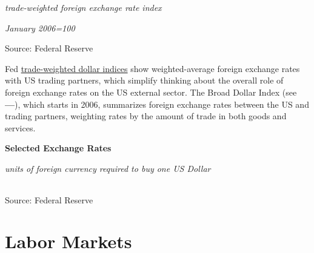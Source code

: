 \documentclass{report}
\makeatletter
\newcommand{\tbllink}[1]{\href{https://raw.githubusercontent.com/bdecon/US-chartbook/master/chartbook/data/#1}{\faTable}}
\newcommand*\short[1]{\expandafter\@gobbletwo\number\numexpr#1\relax}
\newcommand{\dateaxisticks}{
		date coordinates in=x, axis line style={draw=none},
		xmax={2020-10-01},
		max space between ticks=40,	    
		xtick={{1990-01-01}, {1992-01-01}, {1994-01-01}, 
			{1996-01-01}, {1998-01-01}, {2000-01-01}, 
			{2002-01-01}, {2004-01-01}, {2006-01-01},
			{2008-01-01}, {2010-01-01}, {2012-01-01}, {2014-01-01},
		    {2016-01-01}, {2018-01-01}, {2020-01-01}},
		minor xtick={{1989-01-01}, {1991-01-01}, {1993-01-01},
			{1995-01-01}, {1997-01-01}, {1999-01-01}, 
			{2001-01-01}, {2003-01-01}, {2005-01-01}, {2007-01-01},
		    {2009-01-01}, {2011-01-01}, {2013-01-01}, {2015-01-01},
		    {2017-01-01}, {2019-01-01}},
		enlarge y limits={0.06}, enlarge x limits={0.01},
		}
\newcommand{\bbar}[2]{extra #1 ticks = {{#2}}, extra #1 tick labels = ,
		extra #1 tick style = {grid=major, grid style={thick, black!25}},}
\newcommand{\stdline}[4]{\addplot[very thick, no markers, color=#1] 
		table [x=#2, y=#3, col sep=comma] {#4};	}
\newcommand{\rbars}{
		\fill[color=black!10] (axis cs:{1990-07-01},\pgfkeysvalueof{/pgfplots/ymin}) rectangle 
			(axis cs:{1991-03-01}, \pgfkeysvalueof{/pgfplots/ymax});
		\fill[color=black!10] (axis cs:{2007-12-01},\pgfkeysvalueof{/pgfplots/ymin}) rectangle 
			(axis cs:{2009-07-01}, \pgfkeysvalueof{/pgfplots/ymax});
		\fill[color=black!10] (axis cs:{2001-03-01},\pgfkeysvalueof{/pgfplots/ymin}) rectangle 
			(axis cs:{2001-11-01}, \pgfkeysvalueof{/pgfplots/ymax});
		\fill[color=black!10] (axis cs:{2020-02-01},\pgfkeysvalueof{/pgfplots/ymin}) rectangle 
			(axis cs:{2020-10-01}, \pgfkeysvalueof{/pgfplots/ymax});}
\makeatother
\begin{document}
{{{{{{\begin{minipage}{0.33\textwidth}
\footnotesize{\textit{trade-weighted foreign exchange rate index}}

\footnotesize{\textit{January 2006=100}}

\hspace*{-2mm} 

\footnotesize{Source: Federal Reserve} \hfill \tbllink{fx_idx.csv}
\end{minipage}\hspace{8mm}
\begin{minipage}{0.375\textwidth}
\small Fed \href{https://www.federalreserve.gov/releases/h10/summary/default.htm}{trade-weighted dollar indices} show weighted-average foreign exchange rates with US trading partners, which simplify thinking about the overall role of foreign exchange rates on the US external sector. The Broad Dollar Index (see {\color{blue!60!black}\textbf{---}}), which starts in 2006, summarizes foreign exchange rates between the US and trading partners, weighting rates by the amount of trade in both goods and services.\\


\end{minipage}
\newpage
\normalsize \textbf{Selected Exchange Rates}
\vspace{-2mm}

\footnotesize{\textit{units of foreign currency required to buy one US Dollar}}
\vspace{-1mm}

 \setlength{\tabcolsep}{3.0pt} \color{black!90}
		{\renewcommand{\arraystretch}{1.52}
		 \hspace{-1mm}\begin{tabular}{p{16mm} R{15mm} R{15mm} R{15mm} R{14.5mm} 
		 				 R{14.5mm} R{14.5mm}}
			 \hline
		\end{tabular}}	
	
\footnotesize{Source: Federal Reserve}

\newpage
\section*{\color{darkgray}\LARGE Labor Markets}
\label{sec:lab}

}}}}}}
\end{document}
